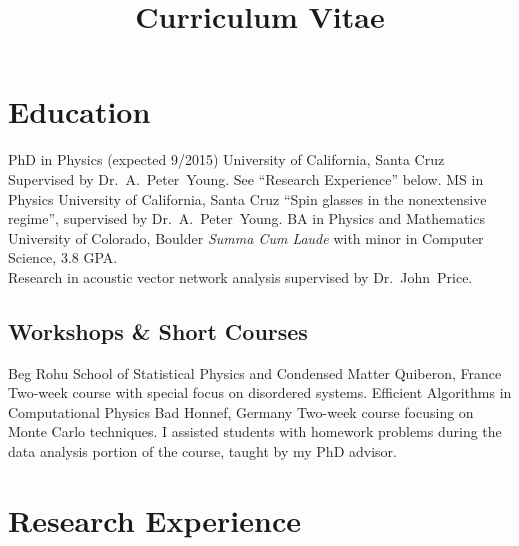\documentclass{cv}
\title{Curriculum Vitae}
\def\Peter{Dr.~A.~Peter~Young}
\def\John{Dr.~John~Price}
\begin{document}
\maketitle

\section{Education}

\begin{cvjobs}
    {PhD in Physics \textnormal{(expected 9/2015)}}
    {University of California, Santa Cruz}
    {Supervised by \Peter. See ``Research Experience'' below.}
    {MS in Physics}
    {University of California, Santa Cruz}
    {``Spin glasses in the nonextensive regime'',
     supervised by \Peter.}
    {BA in Physics and Mathematics}
    {University of Colorado, Boulder}
    {\textit{Summa Cum Laude} with minor in Computer Science, 3.8 GPA. \\
     Research in acoustic vector network analysis supervised by \John.}
\end{cvjobs}

\subsection{Workshops \& Short Courses}

\begin{cvjobs}
    {Beg Rohu School of Statistical Physics and Condensed Matter}
    {Quiberon, France}
    {Two-week course with special focus on disordered systems.}
    {Efficient Algorithms in Computational Physics}
    {Bad Honnef, Germany}
    {Two-week course focusing on Monte Carlo techniques. I assisted students with
     homework problems during the data analysis portion of the course, taught by
     my PhD advisor.} 
\end{cvjobs}

\section{Research Experience}
\end{document}

